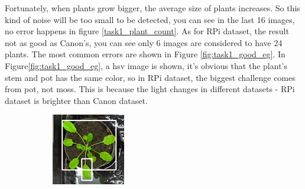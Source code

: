 \documentclass[conference]{IEEEtran}
\begin{document}
Fortunately, when plants grow bigger, the average size of plants increases. So this kind of noise will be too small to be detected, you can see in the last 16 images, no error happens in figure \ref{task1_plant_count}.  
	As for RPi dataset, the result not as good as Canon’s, you can see only 6 images are considered to have 24 plants. The most common errors are shown in Figure \ref{fig:task1_good_eg}. In Figure\ref{fig:task1_good_eg}, a hsv image is shown, it’s obvious that the plant’s stem and pot has the same color, so in RPi dataset, the biggest challenge comes from pot, not moss. This is because the light changes in different datasets - RPi dataset is brighter than Canon dataset. 
    
\begin{figure}[h!]
\centering
\begin{subfigure}[h!]{0.24\textwidth}
    \centering
    \includegraphics[width=\textwidth]{img/task1_good_class.png}
\end{subfigure}
\hfill
\begin{subfigure}[h!]{0.24\textwidth}
    \centering

\end{subfigure}
\end{figure}
\end{document}
